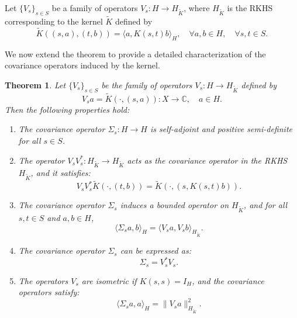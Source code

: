 \documentclass[11pt]{amsart}
\newtheorem{theorem}{Theorem}[section]
\theoremstyle{definition}
\numberwithin{equation}{section}
\begin{document}
Let \( \{ V_s \}_{s \in S} \) be a family of operators \( V_s: H \to H_{\tilde{K}} \), where \( H_{\tilde{K}} \) is the RKHS corresponding to the kernel \( \tilde{K} \) defined by
\[
\tilde{K}((s, a), (t, b)) = \langle a, K(s,t) b \rangle_H, \quad \forall a,b \in H, \quad \forall s,t \in S.
\]

We now extend the theorem to provide a detailed characterization of the covariance operators induced by the kernel.

\begin{theorem}
\label{thm:covariance_operators}
Let \( \{ V_s \}_{s \in S} \) be the family of operators \( V_s: H \to H_{\tilde{K}} \) defined by
\[
V_s a = \tilde{K}(\cdot, (s, a)): X \to \mathbb{C}, \quad a \in H.
\]
Then the following properties hold:
\begin{enumerate}
    \item The covariance operator \( \Sigma_s: H \to H \) is self-adjoint and positive semi-definite for all \( s \in S \).
    \item The operator \( V_s V_s^*: H_{\tilde{K}} \to H_{\tilde{K}} \) acts as the covariance operator in the RKHS \( H_{\tilde{K}} \), and it satisfies:
    \[
    V_s V_s^* \tilde{K}(\cdot, (t, b)) = \tilde{K}(\cdot, (s, K(s,t) b)).
    \]
    \item The covariance operator \( \Sigma_s \) induces a bounded operator on \( H_{\tilde{K}} \), and for all \( s, t \in S \) and \( a, b \in H \),
    \[
    \langle \Sigma_s a, b \rangle_H = \langle V_s a, V_s b \rangle_{H_{\tilde{K}}}.
    \]
    \item The covariance operator \( \Sigma_s \) can be expressed as:
    \[
    \Sigma_s = V_s^* V_s.
    \]
    \item The operators \( V_s \) are isometric if \( K(s,s) = I_H \), and the covariance operators satisfy:
    \[
    \langle \Sigma_s a, a \rangle_H = \| V_s a \|_{H_{\tilde{K}}}^2.
    \]
\end{enumerate}
\end{theorem}
\end{document}

